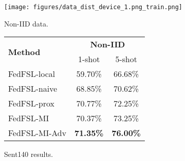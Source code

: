
\makeatletter{}\makeatother
\hspace{-15pt}
\begin{minipage}{0.22\textwidth}
\centering
\texttt{[image: figures/data\_dist\_device\_1.png\_train.png]}
\vspace{-13pt}
\caption{Non-IID data.}
\label{fig:data_nid}
\end{minipage}
\makeatletter{}\makeatother
\hspace{-5pt}
\begin{minipage}{.26\textwidth}
\centering
\small
\vspace{10pt}
\begin{tabular}{lcc} \toprule  
\multirow{2}{*}{\textbf{Method}} & \multicolumn{2}{c}{\textbf{Non-IID}} \\ 
\cmidrule{2-3}     & 1-shot  & 5-shot \\ \toprule
FedFSL-local & 59.70\% & 66.68\% 	\\
FedFSL-naive &  68.85\% & 70.62\%	\\
FedFSL-prox &  70.77\% & 72.25\%	\\
FedFSL-MI  &  70.37\% &  73.25\% \\
FedFSL-MI-Adv  & \textbf{71.35\%} & \textbf{76.00\%}   \\  \midrule \bottomrule
\end{tabular}
\vspace{-2pt}
\caption{Sent140 results.}
\label{tab:res_sent140}
\end{minipage}



